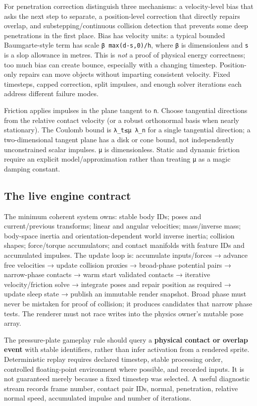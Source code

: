 For penetration correction distinguish three mechanisms: a velocity-level bias that asks the next step to separate, a position-level correction that directly repairs overlap, and substepping/continuous collision detection that prevents some deep penetrations in the first place. Bias has velocity units: a typical bounded Baumgarte-style term has scale \texttt{β\ max(d-s,0)/h}, where \texttt{β} is dimensionless and \texttt{s} is a slop allowance in metres. This is \emph{not} a proof of physical energy correctness; too much bias can create bounce, especially with a changing timestep. Position-only repairs can move objects without imparting consistent velocity. Fixed timesteps, capped correction, split impulses, and enough solver iterations each address different failure modes.

Friction applies impulses in the plane tangent to \texttt{n}. Choose tangential directions from the relative contact velocity (or a robust orthonormal basis when nearly stationary). The Coulomb bound is \texttt{\textbar{}λ\_t\textbar{}≤μ\ λ\_n} for a single tangential direction; a two-dimensional tangent plane has a disk or cone bound, not independently unconstrained scalar impulses. \texttt{μ} is dimensionless. Static and dynamic friction require an explicit model/approximation rather than treating \texttt{μ} as a magic damping constant.

\subsection{The live engine contract}\label{02-foundations-ii-ch039-the-live-engine-contract}

The minimum coherent system owns: stable body IDs; poses and current/previous transforms; linear and angular velocities; mass/inverse mass; body-space inertia and orientation-dependent world inverse inertia; collision shapes; force/torque accumulators; and contact manifolds with feature IDs and accumulated impulses. The update loop is: accumulate inputs/forces → advance free velocities → update collision proxies → broad-phase potential pairs → narrow-phase contacts → warm start validated contacts → iterative velocity/friction solve → integrate poses and repair position as required → update sleep state → publish an immutable render snapshot. Broad phase must never be mistaken for proof of collision; it produces candidates that narrow phase tests. The renderer must not race writes into the physics owner's mutable pose array.

The pressure-plate gameplay rule should query a \textbf{physical contact or overlap event} with stable identifiers, rather than infer activation from a rendered sprite. Deterministic replay requires declared timestep, stable processing order, controlled floating-point environment where possible, and recorded inputs. It is not guaranteed merely because a fixed timestep was selected. A useful diagnostic stream records frame number, contact pair IDs, normal, penetration, relative normal speed, accumulated impulse and number of iterations.

